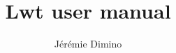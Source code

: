\documentclass{article}
\title{Lwt user manual}
\author{Jérémie Dimino}
\begin{document}
\maketitle
\tableofcontents

\newcommand{\chapter}[1]{}


\end{document}
